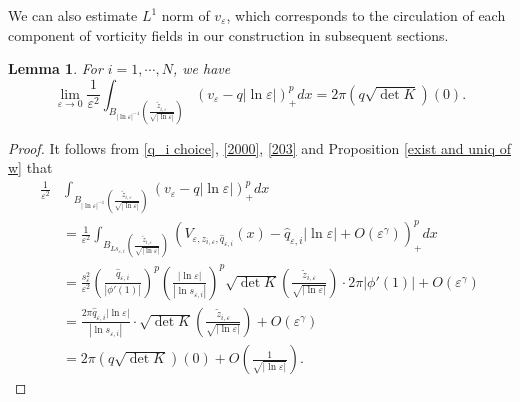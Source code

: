 \documentclass[12pt,reqno]{amsart}
\numberwithin{equation}{section}
\newtheorem{lemma}[theorem]{Lemma}
\theoremstyle{definition}
\theoremstyle{remark}
\begin{document}
We can also estimate     $ L^1 $ norm of $ v_\varepsilon $, which corresponds to the circulation of each component of vorticity fields in our construction in subsequent sections.
\begin{lemma}\label{circulation}
For $ i=1,\cdots,N $, we have
	\begin{equation*}
	\lim_{\varepsilon\to 0}\frac{1}{\varepsilon^2}\int_{B_{|\ln\varepsilon|^{-1}}\left (\frac{\tilde{z}_{i,\varepsilon}}{\sqrt{|\ln\varepsilon|}}\right )}\left (v_\varepsilon-q|\ln \varepsilon|\right )^{p}_+dx=2\pi \left( q\sqrt{\det K}\right) (0).
	\end{equation*}
\end{lemma}
\begin{proof}
	
	It follows from  \eqref{q_i choice}, \eqref{2000}, \eqref{203} and Proposition \ref{exist and uniq of w} that
	\begin{equation*}
	\begin{split}
	\frac{1}{\varepsilon^2}&\int_{B_{|\ln\varepsilon|^{-1}}\left (\frac{\tilde{z}_{i,\varepsilon}}{\sqrt{|\ln\varepsilon|}}\right )}\left (v_\varepsilon-q|\ln \varepsilon|\right )^{p}_+dx
	\\
	&=\frac{1}{\varepsilon^2}\int_{B_{Ls_{\varepsilon,i}}\left (\frac{\tilde{z}_{i,\varepsilon}}{\sqrt{|\ln\varepsilon|}}\right )}\left(V_{\varepsilon, z_{i,\varepsilon}, \hat{q}_{\varepsilon,i}}(x)-\hat{q}_{\varepsilon,i}|\ln\varepsilon|+O\left( \varepsilon^\gamma\right)\right)^{p}_+dx\\
	&=\frac{s_\varepsilon^2}{\varepsilon^2}\left( \frac{\hat{q}_{\varepsilon,i}}{|\phi'(1)|}\right) ^{p}\left( \frac{|\ln\varepsilon|}{|\ln s_{\varepsilon,i}|}\right)^{p}\sqrt{\det K}\left (\frac{\tilde{z}_{i,\varepsilon}}{\sqrt{|\ln\varepsilon|}}\right )\cdot 2\pi|\phi'(1)|+O(\varepsilon^\gamma)\\
	&= \frac{2\pi\hat{q}_{\varepsilon,i} |\ln\varepsilon|}{|\ln s_{\varepsilon,i}|}\cdot \sqrt{\det K }\left (\frac{\tilde{z}_{i,\varepsilon}}{\sqrt{|\ln\varepsilon|}}\right )+O(\varepsilon^\gamma) \\
	&= 2\pi \left( q \sqrt{\det K }\right) (0)+O\left (\frac{1}{\sqrt{|\ln\varepsilon|}}\right ).
	\end{split}
	\end{equation*}
\end{proof}
\end{document}
